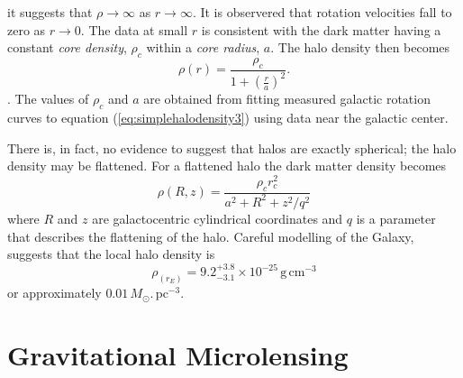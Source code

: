 it suggests that $\rho \rightarrow \infty$ as $r \rightarrow \infty$. It is
observered that rotation velocities fall to zero as $r\rightarrow 0$. The data
at small $r$ is consistent with the dark matter having a constant \emph{core
density}, $\rho_c$ within a \emph{core radius}, $a$. The halo density then
becomes
\begin{equation}
\rho(r) = \frac{\rho_c}{1 + \left(\frac{r}{a}\right)^2}.
\label{eq:simplehalodensity3}
\end{equation}.
The values of $\rho_c$ and $a$ are obtained from fitting measured galactic
rotation curves to equation (\ref{eq:simplehalodensity3}) using data near the
galactic center. 

There is, in fact, no evidence to suggest that halos are
exactly spherical; the halo density may be flattened\cite{Rix:1996}. For a
flattened halo the dark matter density becomes
\begin{equation}
\rho(R,z) = \frac{\rho_c r^2_c}{a^2 + R^2 + z^2/q^2}
\label{eq:simplehalodensity4}
\end{equation}
where $R$ and $z$ are galactocentric cylindrical coordinates and $q$ is a
parameter that describes the flattening of the halo. Careful modelling of the
Galaxy\cite{1995ApJ...449L.123G}, suggests that the local halo density is
\begin{equation}
\rho_(r_E) = 9.2_{-3.1}^{+3.8} \times 10^{-25}\, \mathrm{g}\,\mathrm{cm}^{-3}
\end{equation}
or approximately $0.01\,M_\odot.\,\mathrm{pc}^{-3}$.

\section{Gravitational Microlensing}
\label{s:microlensing}

